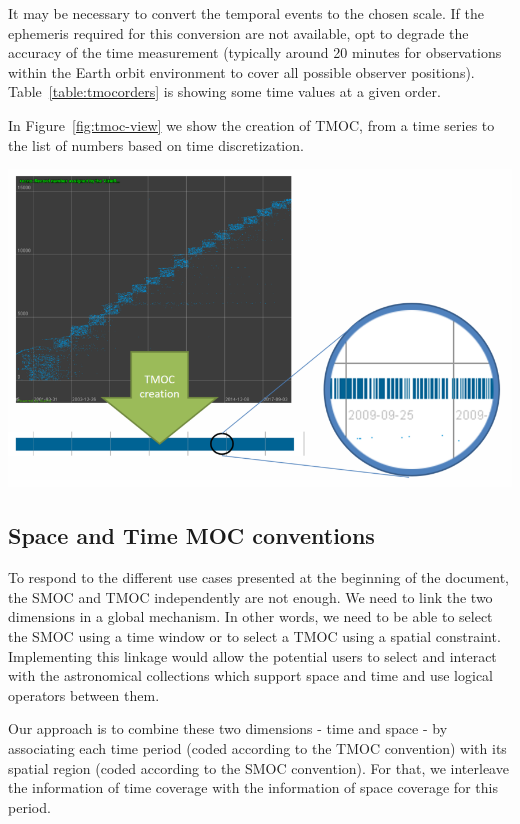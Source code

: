 \documentclass[11pt,a4paper]{ivoa}
\begin{document}
It may be necessary to convert the temporal events to the
chosen scale. If the ephemeris required for this conversion are
not available, opt to degrade the accuracy of the time measurement
(typically around 20 minutes for observations within the Earth orbit
environment to cover all possible observer positions).
Table~\ref{table:tmocorders} is showing some time values at a given order.

In Figure~\ref{fig:tmoc-view} we show the creation of TMOC, from a time
series to the list of numbers based on time discretization.
      
\begin{adjustbox}{center,caption={TMOC: from the
      time series to the list of numbers based on time
      discretization},label={fig:tmoc-view},nofloat=figure,vspace=\bigskipamount}
\includegraphics[width=\textwidth]{tmoc_view.png}
\end{adjustbox} 

\subsection{Space and Time MOC conventions}
To respond to the different use cases presented at the beginning of
the document, the SMOC and TMOC independently are not enough. We need
to link the two dimensions in a global mechanism. In other words, we
need to be able to select the SMOC using a time window or to select a
TMOC using a spatial constraint. Implementing this linkage would allow
the potential users to select and interact with the astronomical
collections which support space and time and use logical
operators between them.

Our approach is to combine these two dimensions - time and space - by
associating each time period (coded according to the TMOC
convention) with its spatial region (coded according to the SMOC
convention). For that, we interleave the information of time coverage
with the information of space coverage for this period.
\end{document}
